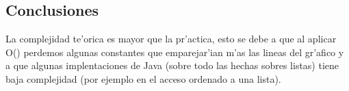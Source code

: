\subsection{Conclusiones}
La complejidad te'orica es mayor que la pr'actica, esto se debe a que al aplicar O() perdemos algunas constantes que emparejar'ian m'as las lineas del gr'afico y a que algunas implentaciones de Java (sobre todo las hechas sobres listas) tiene baja complejidad (por ejemplo en el acceso ordenado a una lista).

\clearpage
